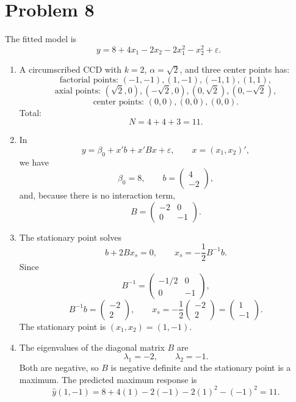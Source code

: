 \documentclass[11pt]{article}
\begin{document}
\section*{Problem 8}

The fitted model is
\[
y=8+4x_1-2x_2-2x_1^2-x_2^2+\varepsilon.
\]

\begin{enumerate}[label=(\alph*)]
\item A circumscribed CCD with \(k=2\), \(\alpha=\sqrt{2}\), and three center points has:
\[
\text{factorial points: }(-1,-1),(1,-1),(-1,1),(1,1),
\]
\[
\text{axial points: }(\sqrt2,0),(-\sqrt2,0),(0,\sqrt2),(0,-\sqrt2),
\]
\[
\text{center points: }(0,0),(0,0),(0,0).
\]
Total:
\[
N=4+4+3=11.
\]

\item In
\[
y=\beta_0+x'b+x'Bx+\varepsilon,\qquad x=(x_1,x_2)',
\]
we have
\[
\beta_0=8,\qquad
b=\begin{pmatrix}4\\-2\end{pmatrix},
\]
and, because there is no interaction term,
\[
B=\begin{pmatrix}-2&0\\0&-1\end{pmatrix}.
\]

\item The stationary point solves
\[
b+2Bx_s=0,\qquad x_s=-\frac12B^{-1}b.
\]
Since
\[
B^{-1}=\begin{pmatrix}-1/2&0\\0&-1\end{pmatrix},
\]
\[
B^{-1}b=\begin{pmatrix}-2\\2\end{pmatrix},
\qquad
x_s=-\frac12\begin{pmatrix}-2\\2\end{pmatrix}
=\begin{pmatrix}1\\-1\end{pmatrix}.
\]
The stationary point is \((x_1,x_2)=(1,-1)\).

\item The eigenvalues of the diagonal matrix \(B\) are
\[
\lambda_1=-2,\qquad \lambda_2=-1.
\]
Both are negative, so \(B\) is negative definite and the stationary point is a maximum. The predicted maximum response is
\[
\hat y(1,-1)=8+4(1)-2(-1)-2(1)^2-(-1)^2=11.
\]
\end{enumerate}
\end{document}
